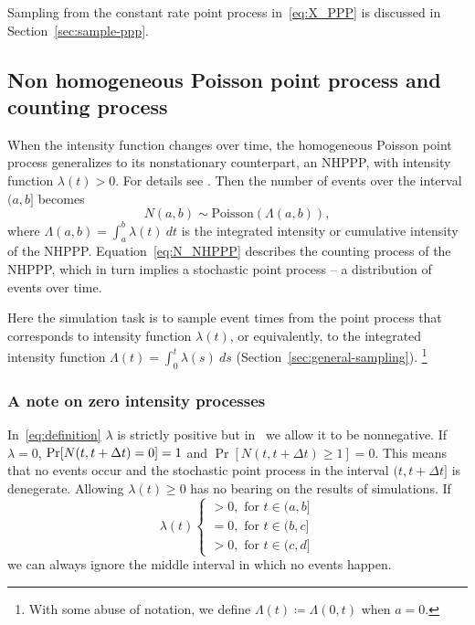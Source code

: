 \documentclass[article,nojss]{jss}\usepackage[]{graphicx}\usepackage[]{xcolor}
\begin{document}
Sampling from the constant rate point process in~\eqref{eq:X_PPP} is discussed in Section~\ref{sec:sample-ppp}.


\subsection{Non homogeneous Poisson point process and counting process}\label{sec:nhppp-intro}
When the intensity function changes over time, the homogeneous Poisson point process generalizes to its nonstationary counterpart, an NHPPP, with intensity function $\lambda(t) > 0$. For details see \citet[par 4.2]{cox1965theory}. Then the number of events over the interval $(a, b]$ becomes
\begin{equation}\label{eq:N_NHPPP}
N(a, b) \sim \text{Poisson}(\Lambda(a, b)),
\end{equation}
where $\Lambda(a, b) = \int_a^b \lambda(t) \ dt$ is the integrated intensity or cumulative intensity of the NHPPP. Equation~\eqref{eq:N_NHPPP} describes the counting process of the NHPPP, which in turn implies a stochastic point process -- a distribution of events over time.

Here the simulation task is to sample event times from the point process that corresponds to intensity function $\lambda(t)$, or equivalently, to the integrated intensity function $\Lambda(t) = \int_0^t \lambda(s) \ ds$ (Section~\ref{sec:general-sampling}).%
\footnote{With some abuse of notation, we define $\Lambda(t) \coloneqq \Lambda(0, t)$ when  $a=0$.}

\subsubsection{A note on zero intensity processes}
In~\eqref{eq:definition} $\lambda$ is strictly positive but in~ we allow it to be nonnegative. If $\lambda = 0$, $\\{\Pr[N(t, t + \Delta t) = 0] = 1}$ and ${\Pr[N(t, t + \Delta t) \ge 1] = 0}$. This means that no events occur and the stochastic point process in the interval $(t, t + \Delta t]$ is denegerate. Allowing $\lambda(t) \ge 0$ has no bearing on the results of simulations. If
\begin{equation*}
    \lambda(t)  \begin{cases}
    >0, \text{ for } t \in (a, b] \\
    =0, \text{ for } t \in (b, c] \\
    >0, \text{ for } t \in (c, d]
    \end{cases}
\end{equation*}
we can always ignore the middle interval in which no events happen.
\end{document}

